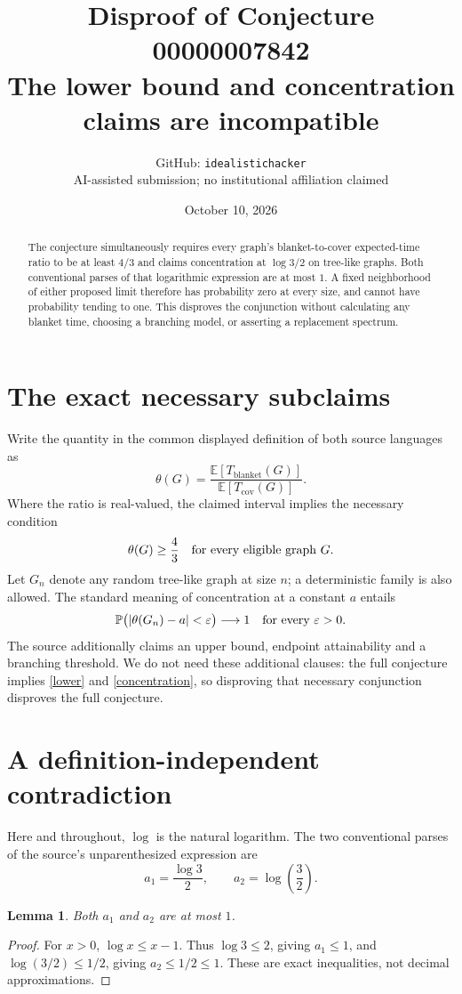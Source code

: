 \documentclass[11pt]{article}
\title{Disproof of Conjecture 00000007842\\\large The lower bound and concentration claims are incompatible}
\author{GitHub: \texttt{idealistichacker}\\\small AI-assisted submission; no institutional affiliation claimed}
\date{October 10, 2026}
\newtheorem{lemma}{Lemma}
\begin{document}
\maketitle
\begin{abstract}
The conjecture simultaneously requires every graph's blanket-to-cover expected-time ratio to be at least $4/3$ and claims concentration at $\log 3/2$ on tree-like graphs. Both conventional parses of that logarithmic expression are at most $1$. A fixed neighborhood of either proposed limit therefore has probability zero at every size, and cannot have probability tending to one. This disproves the conjunction without calculating any blanket time, choosing a branching model, or asserting a replacement spectrum.
\end{abstract}

\section{The exact necessary subclaims}
Write the quantity in the common displayed definition of both source languages as
\[
 \theta(G)=\frac{\mathbb E[T_{\mathrm{blanket}}(G)]}{\mathbb E[T_{\mathrm{cov}}(G)]}.
\]
Where the ratio is real-valued, the claimed interval implies the necessary condition
\begin{equation}\label{lower}
 \theta(G)\geq \frac43\quad\hbox{for every eligible graph }G.
\end{equation}
Let $G_n$ denote any random tree-like graph at size $n$; a deterministic family is also allowed. The standard meaning of concentration at a constant $a$ entails
\begin{equation}\label{concentration}
 \mathbb P\bigl(|\theta(G_n)-a|<\varepsilon\bigr)\longrightarrow 1
 \quad\hbox{for every }\varepsilon>0.
\end{equation}
The source additionally claims an upper bound, endpoint attainability and a branching threshold. We do not need these additional clauses: the full conjecture implies \eqref{lower} and \eqref{concentration}, so disproving that necessary conjunction disproves the full conjecture.

\section{A definition-independent contradiction}
Here and throughout, $\log$ is the natural logarithm. The two conventional parses of the source's unparenthesized expression are
\[
 a_1=\frac{\log 3}{2},\qquad a_2=\log\!\left(\frac32\right).
\]
\begin{samepage}
\begin{lemma}
Both $a_1$ and $a_2$ are at most $1$.
\end{lemma}
\begin{proof}
For $x>0$, $\log x\leq x-1$. Thus $\log 3\leq2$, giving $a_1\leq1$, and $\log(3/2)\leq1/2$, giving $a_2\leq1/2\leq1$. These are exact inequalities, not decimal approximations.
\end{proof}
\end{samepage}
\end{document}
